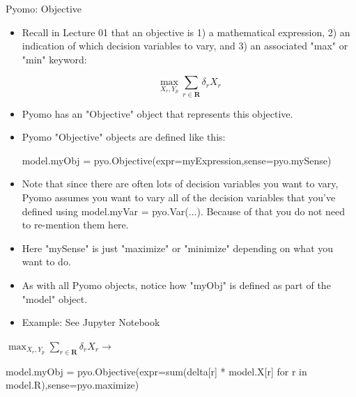 \documentclass[10pt, aspectratio=169]{beamer}
\begin{document}
\begin{frame}{Pyomo: Objective}
    \begin{itemize}
        \item Recall in Lecture 01 that an objective is 1) a mathematical expression, 2) an indication of which decision variables to vary, and 3) an associated "max" or "min" keyword:
        
        $$\max_{X_r,Y_p} \sum_{r \in \textbf{R}}\delta_r X_r$$

        \item Pyomo has an "Objective" object that represents this objective.
        \item Pyomo "Objective" objects are defined like this:
        
        \hspace{0.25cm} model.myObj = pyo.Objective(expr=myExpression,sense=pyo.mySense)
    
        \item Note that since there are often lots of decision variables you want to vary, Pyomo assumes you want to vary all of the decision variables that you've defined using model.myVar = pyo.Var(...). Because of that you do not need to re-mention them here.
        \item Here "mySense" is just "maximize" or "minimize" depending on what you want to do.
        \item As with all Pyomo objects, notice how "myObj" is defined as part of the "model" object.
        \item Example: See Jupyter Notebook
    \end{itemize}

    \begin{center}
        $\max_{X_r,Y_p} \sum_{r \in \textbf{R}}\delta_r X_r \rightarrow$ 
        
        model.myObj = pyo.Objective(expr=sum(delta[r] * model.X[r] for r in model.R),sense=pyo.maximize) 
    \end{center}
\end{frame}
\end{document}
